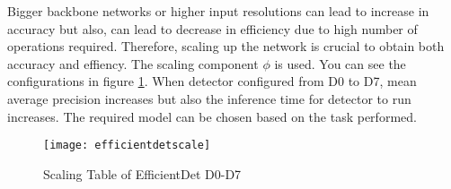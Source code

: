 \documentclass{article}
\begin{document}
Bigger backbone networks or higher input resolutions can lead to increase 
in accuracy but also, can lead to decrease in efficiency due to high 
number of operations required. Therefore, scaling up the network is crucial 
to obtain both accuracy and effiency. The scaling component $\phi$ is used. 
You can see the configurations in figure \ref{fig:efficientdetscale1}. 
When detector configured from D0 to D7, mean average precision increases but 
also the inference time for detector to run increases. The required model 
can be chosen based on the task performed. 

\begin{figure}
    \centering
    \texttt{[image: efficientdetscale]}
    \caption{Scaling Table of EfficientDet D0-D7}
    \label{fig:efficientdetscale1}
\end{figure}
\end{document}
